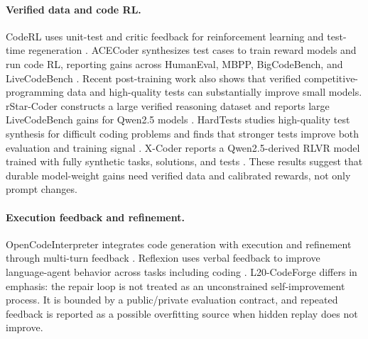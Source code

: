 \documentclass[11pt]{article}
\begin{document}
\paragraph{Verified data and code RL.}
CodeRL uses unit-test and critic feedback for reinforcement learning and
test-time regeneration \citep{le2022coderl}. ACECoder synthesizes test cases to
train reward models and run code RL, reporting gains across HumanEval, MBPP,
BigCodeBench, and LiveCodeBench \citep{zeng2025acecoder}. Recent
post-training work also shows that verified competitive-programming data and
high-quality tests can substantially improve small models. rStar-Coder
constructs a large verified reasoning dataset and reports large LiveCodeBench
gains for Qwen2.5 models \citep{liu2025rstarcoder}. HardTests studies
high-quality test synthesis for difficult coding problems and finds that
stronger tests improve both evaluation and training signal
\citep{he2025hardtests}. X-Coder reports a Qwen2.5-derived RLVR model trained
with fully synthetic tasks, solutions, and tests \citep{wu2026xcoder}. These
results suggest that durable model-weight gains need verified data and
calibrated rewards, not only prompt changes.

\paragraph{Execution feedback and refinement.}
OpenCodeInterpreter integrates code generation with execution and refinement
through multi-turn feedback \citep{zheng2024opencodeinterpreter}. Reflexion
uses verbal feedback to improve language-agent behavior across tasks including
coding \citep{shinn2023reflexion}. L20-CodeForge differs in emphasis: the
repair loop is not treated as an unconstrained self-improvement process. It is
bounded by a public/private evaluation contract, and repeated feedback is
reported as a possible overfitting source when hidden replay does not improve.
\end{document}
